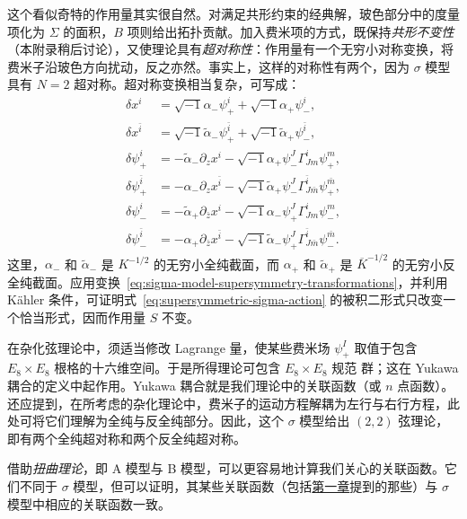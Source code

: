 这个看似奇特的作用量其实很自然。对满足共形约束的经典解，玻色部分中的度量项化为 $\Sigma$ 的面积，$B$ 项则给出拓扑贡献。加入费米项的方式，既保持\emph{共形不变性}（本附录稍后讨论），又使理论具有\emph{超对称性}：作用量有一个无穷小对称变换，将费米子沿玻色方向扰动，反之亦然。事实上，这样的对称性有两个，因为 $\sigma$ 模型具有 $N=2$ 超对称。超对称变换相当复杂，可写成：
\begin{equation}\label{eq:sigma-model-supersymmetry-transformations}
\begin{aligned}
\delta x^i&=\sqrt{-1}\alpha_-\psi_+^i+\sqrt{-1}\alpha_+\psi_-^i,\\
\delta x^{\bar i}&=\sqrt{-1}\widetilde\alpha_-\psi_+^{\bar i}
+\sqrt{-1}\widetilde\alpha_+\psi_-^{\bar i},\\
\delta\psi_+^i&=-\widetilde\alpha_-\partial_zx^i
-\sqrt{-1}\alpha_+\psi_-^J\Gamma^i_{Jm}\psi_+^m,\\
\delta\psi_+^{\bar i}&=-\alpha_-\partial_zx^{\bar i}
-\sqrt{-1}\widetilde\alpha_+\psi_-^J\Gamma^{\bar i}_{J\bar m}\psi_+^{\bar m},\\
\delta\psi_-^i&=-\widetilde\alpha_+\partial_{\bar z}x^i
-\sqrt{-1}\alpha_-\psi_+^J\Gamma^i_{Jm}\psi_-^m,\\
\delta\psi_-^{\bar i}&=-\alpha_+\partial_{\bar z}x^{\bar i}
-\sqrt{-1}\widetilde\alpha_-\psi_+^J\Gamma^{\bar i}_{J\bar m}\psi_-^{\bar m}.
\end{aligned}
\end{equation}
这里，$\alpha_-$ 和 $\widetilde\alpha_-$ 是 $K^{-1/2}$ 的无穷小全纯截面，而 $\alpha_+$ 和 $\widetilde\alpha_+$ 是 $\overline K^{-1/2}$ 的无穷小反全纯截面。应用变换~\eqref{eq:sigma-model-supersymmetry-transformations}，并利用 Kähler 条件，可证明式~\eqref{eq:supersymmetric-sigma-action} 的被积二形式只改变一个恰当形式，因而作用量 $S$ 不变。

在杂化弦理论中，须适当修改 Lagrange 量，使某些费米场 $\psi_+^I$ 取值于包含 $E_8\times E_8$ 根格的十六维空间。于是所得理论可包含 $E_8\times E_8$ 规范
群；这在 Yukawa 耦合的定义中起作用。Yukawa 耦合就是我们理论中的关联函数（或 $n$ 点函数）。还应提到，在所考虑的杂化理论中，费米子的运动方程解耦为左行与右行方程，此处可将它们理解为全纯与反全纯部分。因此，这个 $\sigma$ 模型给出 $(2,2)$ 弦理论，即有两个全纯超对称和两个反全纯超对称。

借助\emph{扭曲理论}，即 A 模型与 B 模型，可以更容易地计算我们关心的关联函数。它们不同于 $\sigma$ 模型，但可以证明，其某些关联函数（包括\hyperref[chap:introduction]{第一章}提到的那些）与 $\sigma$ 模型中相应的关联函数一致。

